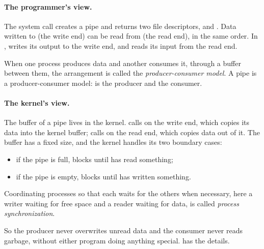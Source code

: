 \paragraph{The programmer's view.} The  system call creates a pipe and returns two file descriptors,  and . Data written to  (the write end) can be read from  (the read end), in the same order. In ,  writes its output to the write end, and  reads its input from the read end.

\begin{definition}
  When one process produces data and another consumes it, through a buffer between them, the arrangement is called the \emph{producer-consumer model}. A pipe is a producer-consumer model:  is the producer and  the consumer.
\end{definition}

\paragraph{The kernel's view.} The buffer of a pipe lives in the kernel.  calls  on the write end, which copies its data into the kernel buffer;  calls  on the read end, which copies data out of it. The buffer has a fixed size, and the kernel handles its two boundary cases:
\begin{itemize}
  \item if the pipe is full,  blocks until  has read something;
  \item if the pipe is empty,  blocks until  has written something.
\end{itemize}

\begin{definition}
  Coordinating processes so that each waits for the others when necessary, here a writer waiting for free space and a reader waiting for data, is called \emph{process synchronization}.
\end{definition}

So the producer never overwrites unread data and the consumer never reads garbage, without either program doing anything special.  has the details.

